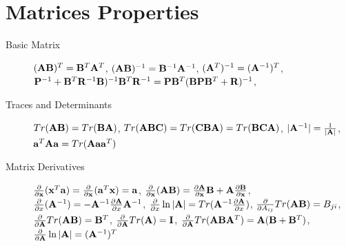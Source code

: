 \section{Matrices Properties}
\begin{description}
    \item[Basic Matrix]
        $(\mathbf{A}\mathbf{B})^T = \mathbf{B}^T\mathbf{A}^T$, 
    $(\mathbf{A}\mathbf{B})^{-1} = \mathbf{B}^{-1}\mathbf{A}^{-1}$, $(\mathbf{A}^T)^{-1} = (\mathbf{A}^{-1})^T$, 
    $\mathbf{P}^{-1}+\mathbf{B}^T \mathbf{R}^{-1}\mathbf{B})^{-1}\mathbf{B}^T\mathbf{R}^{-1} = \mathbf{P}\mathbf{B}^T(\mathbf{B}
    \mathbf{P}\mathbf{B}^T+\mathbf{R})^{-1}$, 
\item[Traces and Determinants] $Tr(\mathbf{A}\mathbf{B}) = Tr(\mathbf{B}\mathbf{A})$, $Tr(\mathbf{A}\mathbf{B}\mathbf{C}) = Tr(\mathbf{C}\mathbf{B}\mathbf{A}) = Tr(\mathbf{B}\mathbf{C}\mathbf{A})$,
    $|\mathbf{A}^{-1}| = \frac{1}{|\mathbf{A}|}$, $\mathbf{a}^T\mathbf{A}\mathbf{a} = Tr(\mathbf{A} \mathbf{a}\mathbf{a}^T)$
\item[Matrix Derivatives] $\frac{\partial}{\partial \mathbf{x}}(\mathbf{x}^T\mathbf{a}) =
    \frac{\partial}{\partial \mathbf{x}}(\mathbf{a}^T\mathbf{x}) = \mathbf{a}$,
    $\frac{\partial}{\partial\mathbf{x}}(\mathbf{A}\mathbf{B}) = \frac{\partial \mathbf{A}}{\partial \mathbf{x}}\mathbf{B}
    +\mathbf{A}\frac{\partial \mathbf{B}}{\partial \mathbf{x}}$, $\frac{\partial}{\partial
    x}(\mathbf{A}^{-1}) = -\mathbf{A}^{-1}\frac{\partial \mathbf{A}}{\partial x}\mathbf{A}^{-1}$, 
    $\frac{\partial}{\partial x}\ln |\mathbf{A}| = Tr(\mathbf{A}^{-1}\frac{\partial
    \mathbf{A}}{\partial x})$, $\frac{\partial}{\partial A_{ij}}Tr(\mathbf{A}\mathbf{B}) = B_{ji}$,
    $\frac{\partial}{\partial \mathbf{A}}Tr(\mathbf{A}\mathbf{B}) = \mathbf{B}^T$, $\frac{\partial}{\partial
    \mathbf{A}}Tr(\mathbf{A}) = \mathbf{I}$, $\frac{\partial}{\partial \mathbf{A}}Tr(\mathbf{A}\mathbf{B}\mathbf{A}^T) =
    \mathbf{A}(\mathbf{B}+\mathbf{B}^T)$, $\frac{\partial}{\partial \mathbf{A}}\ln |\mathbf{A}| = (\mathbf{A}^{-1})^T$
\end{description}

